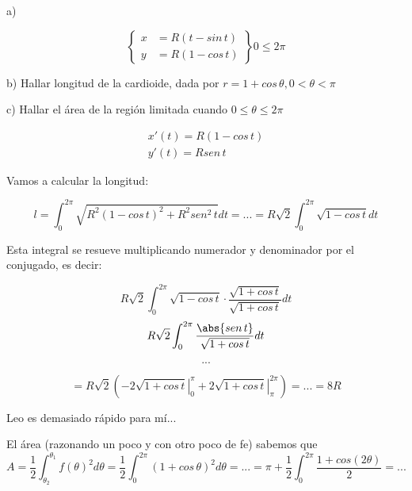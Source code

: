 \begin{problem}[3]
\ppart a) 

\[\left\{\begin{array}{cc}
x&=R(t-sin\,t)\\
y&=R(1-cos\,t)
\end{array}\right\}  0\leq2\pi\]

\ppart b) Hallar longitud de la cardioide, dada por $r = 1+cos\,\theta,0<\theta<\pi$

\ppart c) Hallar el área de la región limitada cuando $0\leq\theta\leq2\pi$

\solution

\spart

\begin{gather*}
x'(t) = R(1-cos\,t)\\
y'(t) = Rsen\,t
\end{gather*}

Vamos a calcular la longitud:

\[l = \int_0^{2\pi}\sqrt{R^2(1-cos\,t)^2 + R^2sen^2\,t}dt = ... = R\sqrt{2}\int_0^{2\pi} \sqrt{1-cos\,t}dt\]

Esta integral se resueve multiplicando numerador y denominador por el conjugado, es decir:

\[R\sqrt{2}\int_0^{2\pi} \sqrt{1-cos\,t}\cdot\frac{\sqrt{1+cos\,t}}{\sqrt{1+cos\,t}}dt\]
\[R\sqrt{2}\int_0^{2\pi} \frac{\abs{sen\,t}}{\sqrt{1+cos\,t}} dt\]

\[...\]

\[ = R\sqrt{2} \left(\left.-2\sqrt{1+cos\,t}\right|_0^{\pi} + \left.2\sqrt{1+cos\,t}\right|_{\pi}^{2\pi}\right) = ... = 8R
\]

\spart Leo es demasiado rápido para mí...

\spart 
El área (razonando un poco y con otro poco de fe) sabemos que
 \[A = \frac{1}{2} \int_{\theta_2}^{\theta_1}f(\theta)^2d\theta = 
\frac{1}{2} \int_{0}^{2\pi}(1+cos\,\theta)^2d\theta = ... = \pi + \frac{1}{2}\int_0^{2\pi}\frac{1+cos(2\theta)}{2} = ... \]
\end{problem}


